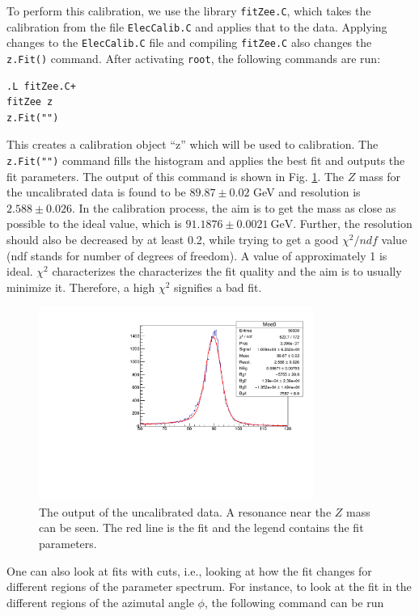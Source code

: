 \documentclass[a4paper]{report}
\numberwithin{equation}{section}
\begin{document}
To perform this calibration, we use the library \texttt{fitZee.C}, which takes the calibration from the file \texttt{ElecCalib.C} and applies that to the data. Applying changes to the \texttt{ElecCalib.C} file and compiling \texttt{fitZee.C} also changes the \texttt{z.Fit()} command. After activating \texttt{root}, the following commands are run:

\begin{verbatim}
.L fitZee.C+
fitZee z
z.Fit("")
\end{verbatim}
This creates a calibration object ``z'' which will be used to calibration. The \texttt{z.Fit("")} command fills the histogram and applies the best fit and outputs the fit parameters. The output of this command is shown in Fig. \ref{fig:uncalib}. The $Z$ mass for the uncalibrated data is found to be $89.87 \pm 0.02$ GeV and resolution is $2.588 \pm 0.026$. In the calibration process, the aim is to get the mass as close as possible to the ideal value, which is $91.1876 \pm 0.0021 \ \text{GeV}$. Further, the resolution should also be decreased by at least 0.2, while trying to get a good $\chi^2 / ndf$ value (ndf stands for number of degrees of freedom). A value of approximately 1 is ideal. $\chi^2$ characterizes the characterizes the fit quality and the aim is to usually minimize it. Therefore, a high $\chi^2$ signifies a bad fit. 

\begin{figure}[htpb]
    \centering
    \includegraphics[width=0.8\textwidth]{uncalib}
    \caption{The output of the uncalibrated data. A resonance near the $Z$ mass can be seen. The red line is the fit and the legend contains the fit parameters.}
    \label{fig:uncalib}
\end{figure}

One can also look at fits with cuts, i.e., looking at how the fit changes for different regions of the parameter spectrum. For instance, to look at the fit in the different regions of the azimutal angle $\phi$, the following command can be run
\end{document}
